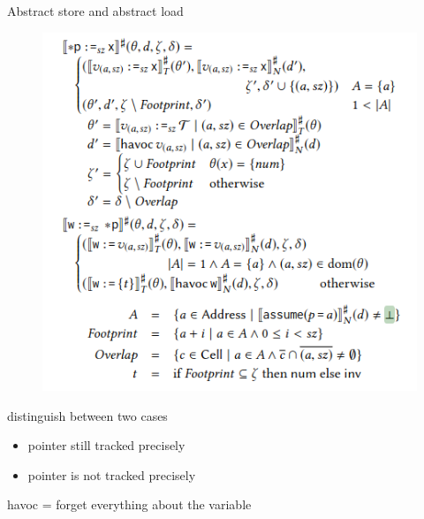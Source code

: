 \documentclass[aspectratio=169]{beamer}
\begin{document}
\begin{frame}{Abstract store and abstract load}
  \noindent
  \begin{minipage}{0.55\textwidth}
    \begin{figure}
      \centering
      \includegraphics[width=\textwidth]{loadstore.png}
    \end{figure}
  \end{minipage}
  \begin{minipage}{0.40\textwidth}
    distinguish between two cases
    \begin{itemize}
      \item pointer still tracked precisely
      \item pointer is not tracked precisely
    \end{itemize}
    havoc = forget everything about the variable

  \end{minipage}
\end{frame}
\end{document}
